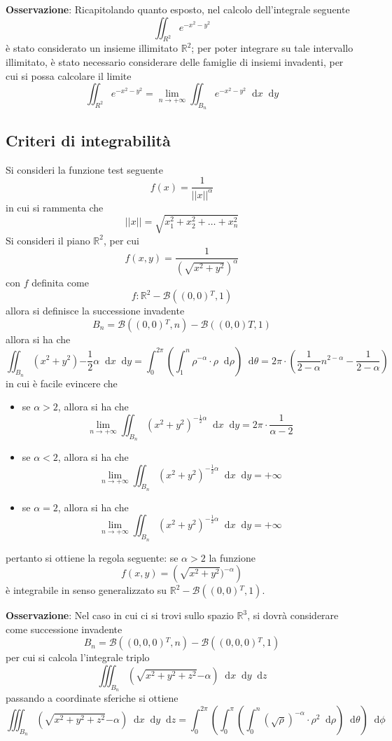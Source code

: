 \documentclass[a4paper]{extarticle}
\newcommand*\dif{\mathop{}\!\mathrm{d}}
\begin{document}
\vspace{2em}
\noindent
\textbf{Osservazione}: Ricapitolando quanto esposto, nel calcolo dell'integrale seguente
\[\iint_{R^2} e^{-x^2-y^2}\]
è stato considerato un insieme illimitato $\mathbb{R}^2$; per poter integrare su tale intervallo illimitato, è stato necessario considerare delle famiglie di insiemi invadenti, per cui si possa calcolare il limite
\[\iint_{R^2} e^{-x^2-y^2} = \lim_{n \to +\infty} \iint_{B_n} e^{-x^2-y^2} \dif x \dif y\]

\vspace{1em}
\subsection{Criteri di integrabilità}
Si consideri la funzione test seguente
\[f(x)=\dfrac{1}{\vert \vert x \vert \vert^\alpha}\]
in cui si rammenta che
\[\vert \vert x \vert \vert = \sqrt{x_1^2+x_2^2+\dots+x_n^2}\]
Si consideri il piano $\mathbb{R}^2$, per cui
\[f(x,y) = \dfrac{1}{\left(\sqrt{x^2+y^2}\right)^{\alpha}}\]
con $f$ definita come
\[f : \mathbb{R}^2 - \mathcal{B}((0,0){^T},1)\]
allora si definisce la successione invadente
\[B_n=\mathcal{B}((0,0){^T}, n) - \mathcal{B}((0,0){T},1)\]
allora si ha che
\[\iint_{B_n} (x^2+y^2){-\frac{1}{2} \alpha} \dif x \dif y = \int_0^{2\pi} \left(\int_1^{n}\rho^{-\alpha} \cdot \rho \dif \rho\right) \dif \theta = 2\pi \cdot \left(\dfrac{1}{2-\alpha} n^{2-\alpha} - \dfrac{1}{2-\alpha}\right)\]
in cui è facile evincere che
\begin{itemize}
    \item se $\alpha > 2$, allora si ha che
    \[\lim_{n \to +\infty} \iint_{B_n} (x^2+y^2)^{-\frac{1}{2} \alpha} \dif x \dif y = 2\pi \cdot \dfrac{1}{\alpha - 2}\]
    \item se $\alpha < 2$, allora si ha che
    \[\lim_{n \to +\infty} \iint_{B_n} (x^2+y^2)^{-\frac{1}{2} \alpha} \dif x \dif y = +\infty\]
    \item se $\alpha = 2$, allora si ha che
    \[\lim_{n \to +\infty} \iint_{B_n} (x^2+y^2)^{-\frac{1}{2} \alpha} \dif x \dif y = +\infty\]
\end{itemize}
pertanto si ottiene la regola seguente: se $\alpha > 2$ la funzione
\[f(x,y) = \left(\sqrt{x^2+y^2})^{-\alpha}\right)\]
è integrabile in senso generalizzato su $\mathbb{R}^2 - \mathcal{B}((0,0){^T},1)$.

\vspace{2em}
\noindent
\textbf{Osservazione}: Nel caso in cui ci si trovi sullo spazio $\mathbb{R}^3$, si dovrà considerare come successione invadente
\[B_n = \mathcal{B}((0,0,0){^T}, n) - \mathcal{B}((0,0,0){^T},1)\]
per cui si calcola l'integrale triplo
\[\iiint_{B_n} \left(\sqrt{x^2+y^2+z^2}{-\alpha}\right) \dif x \dif y \dif z\]
passando a coordinate sferiche si ottiene
\[\iiint_{B_n} \left(\sqrt{x^2+y^2+z^2}{-\alpha}\right) \dif x \dif y \dif z = \int_0^{2\pi} \left(\int_0^\pi \left(\int_0^n \left(\sqrt{\rho}\right)^{-\alpha} \cdot \rho^2 \dif \rho \right) \dif \theta \right) \dif \phi\]
\end{document}
